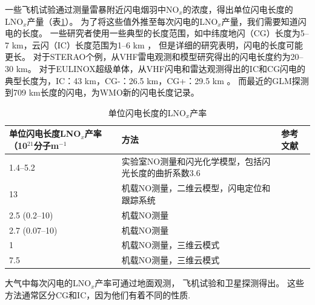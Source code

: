 一些飞机试验通过测量雷暴附近闪电烟羽中NO$_x$的浓度，得出单位闪电长度的LNO$_x$产量（表\ref{table:LNOx/length}）。
为了将这些值外推至每次闪电的LNO$_x$产量，我们需要知道闪电的长度。
一些研究者使用一些典型的长度范围，如中纬度地闪（CG）长度为5--7 km，云闪（IC）长度范围为1--6 km \citep{Price.1997b}，
但是详细的研究表明，闪电的长度可能更长\citep{Defer.2001,Thery.2001,Peterson.2020b}。
对于STERAO个例，从VHF雷电观测和模型研究得出的闪电长度约为20--30 km\citep{Defer.2001}。
对于EULINOX超级单体，从VHF闪电和雷达观测得出的IC和CG闪电的典型长度为，IC：43 km，CG-：26.5 km，CG+：29.5 km \citep{Dotzek.2000}。
而最近的GLM探测到709 km长度的闪电，为WMO新的闪电长度记录\citep{Peterson.2020b}。

\clearpage %
{
\centering
\footnotesize
\begin{longtable}
{|p{15em}|p{13em}|p{10em}|}
\caption{单位闪电长度的LNO$_x$产率}
\label{table:LNOx/length} \\
\hline
单位闪电长度LNO$_x$产率（10$^{21}$分子m$^{-1}$   & 方法                          & 参考文献 \\ \hline
1.4--5.2                                     & 实验室NO测量和闪光化学模型，包括闪光长度的曲折系数3.6   & \citet{Wang.1998} \\ \hline
13                                           & 机载NO测量，二维云模型，闪电定位和跟踪系统  & \citet{Holler.1999} \\ \hline
2.5 (0.2--10)                                & 机载NO测量                     & \citet{Stith.1999} \\ \hline
2.7 (0.07--10)                               & 机载NO测量                     & \citet{Huntrieser.2002} \\ \hline
1                                            & 机载NO测量，三维云模式           & \citet{Skamarock.2003} \\ \hline
7.5                                          & 机载NO测量，三维云模式           & \citet{Ott.2007} \\ \hline
\end{longtable}\par
}


大气中每次闪电的LNO$_x$产率可通过地面观测\citep{Noxon.1976}，
飞机试验\citep{Chameides.1987}和卫星探测\citep{Beirle.2004}得出。
这些方法通常区分CG和IC，因为他们有着不同的性质.


